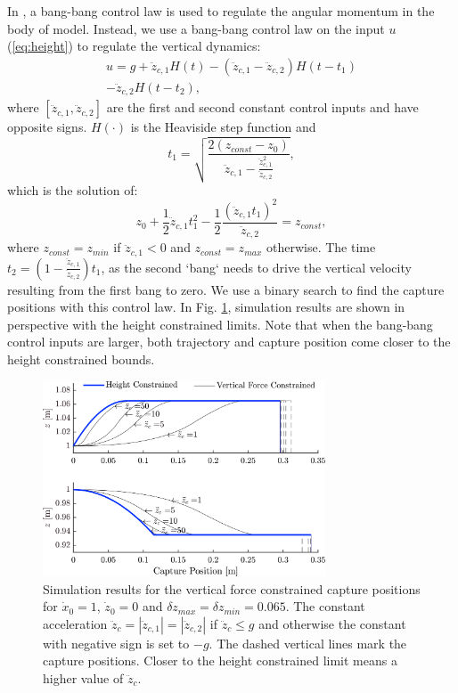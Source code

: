 \documentclass[letterpaper, 10 pt, conference]{ieeeconf}  %
\newcommand{\zmin}{z_{min}}
\newcommand{\zmax}{z_{max}}
\newcommand{\ddzcf}{\ddot{z}_{c,1}}
\newcommand{\ddzcs}{\ddot{z}_{c,2}}
\begin{document}
In \cite{pratt2006capture,stephens2007humanoid,koolen2012capturability}, a bang-bang control law is used to regulate the angular momentum in the body of model. Instead, we use a bang-bang control law on the input $u$ (\ref{eq:height}) to regulate the vertical dynamics:
\begin{multline}
	u = g + \ddot{z}_{c,1}H(t) - (\ddot{z}_{c,1} - \ddot{z}_{c,2})H(t-t_1) \\ - \ddot{z}_{c,2}H(t-t_2),
\end{multline}
where $[\ddzcf,\ddzcs]$ are the first and second constant control inputs and have opposite signs. $H(\cdot)$ is the Heaviside step function and 
\begin{equation}
t_1=\sqrt{\frac{2(z_{const}-z_0)}{\ddzcf - \frac{\ddzcf^2}{\ddzcs}}},
\end{equation}
which is the solution of:
\begin{equation}
	z_0+\frac{1}{2}\ddzcf t_1^2 - \frac{1}{2}\frac{(\ddzcf t_1)^2}{\ddzcs}= z_{const},
\end{equation}
where $z_{const}=\zmin$ if $\ddzcf <0$ and $z_{const}=\zmax$ otherwise. The time $t_2=(1-\frac{\ddzcf}{\ddzcs})t_1$, as the second `bang` needs to drive the vertical velocity resulting from the first bang to zero. We use a binary search to find the capture positions with this control law. In Fig. \ref{fig:zvsf}, simulation results are shown in perspective with the height constrained limits. Note that when the bang-bang control inputs are larger, both trajectory and capture position come closer to the height constrained bounds.
\begin{figure}
      \centering
      \includegraphics[width=3.3in]{heightvsforcelim2.png}
      \caption{Simulation results for the vertical force constrained capture positions for $\dot{x}_0=1$, $\dot{z}_0=0$ and $\delta \zmax=\delta \zmin=0.065$. The constant acceleration $\ddot{z}_c=|\ddzcf|=|\ddzcs|$ if $\ddot{z}_c \leq g$ and otherwise the constant with negative sign is set to $-g$. The dashed vertical lines mark the capture positions. Closer to the height constrained limit means a higher value of $\ddot{z}_c$.}
      \label{fig:zvsf}
\end{figure}
\end{document}
